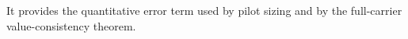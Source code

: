 It provides the quantitative error term used by pilot sizing and by the full-carrier value-consistency theorem.
